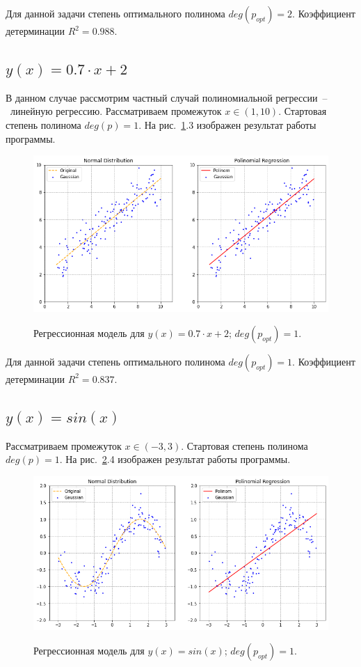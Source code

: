 \documentclass[12pt, a4paper]{article}
\begin{document}
    Для данной задачи степень оптимального полинома $deg(p_{opt}) = 2$. 
    Коэффициент детерминации $R^{2} = 0.988$.
    
    \subsection{$y(x) = 0.7 \cdot x + 2$}
    
    В данном случае рассмотрим частный случай полиномиальной 
    регрессии~--~линейную регрессию. Рассматриваем промежуток $x \in (1, 
    10)$. Стартовая степень полинома $deg(p) = 1$. На рис.~\ref{image43}.3 
    изображен результат работы программы.
    
    \begin{figure}[h!]
        \center
        \includegraphics[width = 14cm]{f3.png}
        \label{image43}
        \caption{Регрессионная модель для $y(x) = 0.7 \cdot x + 2$; 
            $deg(p_{opt}) = 1$.}
    \end{figure}
    
    Для данной задачи степень оптимального полинома $deg(p_{opt}) = 1$. 
    Коэффициент детерминации $R^{2} = 0.837$.
    
    \subsection{$y(x) = sin(x)$}
    
    Рассматриваем промежуток $x \in (-3, 3)$. Стартовая степень полинома 
    $deg(p) = 1$. На рис.~\ref{image44}.4 изображен результат работы 
    программы.
    
    \begin{figure}[h!]
        \center
        \includegraphics[width = 14cm]{f4_1.png}
        \label{image44}
        \caption{Регрессионная модель для $y(x) = sin(x)$; $deg(p_{opt}) = 
            1$.}
    \end{figure}
    
\end{document}
